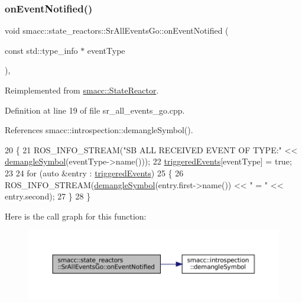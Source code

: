 \subsubsection{\texorpdfstring{on\+Event\+Notified()}{onEventNotified()}}
{\footnotesize\ttfamily void smacc\+::state\+\_\+reactors\+::\+Sr\+All\+Events\+Go\+::on\+Event\+Notified (\begin{DoxyParamCaption}\item[{const std\+::type\+\_\+info $\ast$}]{event\+Type }\end{DoxyParamCaption})\hspace{0.3cm}{\ttfamily [override]}, {\ttfamily [virtual]}}



Reimplemented from \hyperlink{classsmacc_1_1StateReactor_a17646b3c68a6d80d1e4da8c14238ce36}{smacc\+::\+State\+Reactor}.



Definition at line 19 of file sr\+\_\+all\+\_\+events\+\_\+go.\+cpp.



References smacc\+::introspection\+::demangle\+Symbol().


\begin{DoxyCode}
20 \{
21     ROS\_INFO\_STREAM(\textcolor{stringliteral}{"SB ALL RECEIVED EVENT OF TYPE:"} << \hyperlink{namespacesmacc_1_1introspection_a2f495108db3e57604d8d3ff5ef030302}{demangleSymbol}(eventType->name()));
22     \hyperlink{classsmacc_1_1state__reactors_1_1SrAllEventsGo_a2c3d7c7e15ed155ae6e83fe49e7897e9}{triggeredEvents}[eventType] = \textcolor{keyword}{true};
23 
24     \textcolor{keywordflow}{for} (\textcolor{keyword}{auto} &entry : \hyperlink{classsmacc_1_1state__reactors_1_1SrAllEventsGo_a2c3d7c7e15ed155ae6e83fe49e7897e9}{triggeredEvents})
25     \{
26         ROS\_INFO\_STREAM(\hyperlink{namespacesmacc_1_1introspection_a2f495108db3e57604d8d3ff5ef030302}{demangleSymbol}(entry.first->name()) << \textcolor{stringliteral}{" = "} << entry.second);
27     \}
28 \}
\end{DoxyCode}
Here is the call graph for this function\+:
\nopagebreak
\begin{figure}[H]
\begin{center}
\leavevmode
\includegraphics[width=350pt]{classsmacc_1_1state__reactors_1_1SrAllEventsGo_abd72dc79374c34111d24691c459850c2_cgraph}
\end{center}
\end{figure}
\mbox{\label{classsmacc_1_1state__reactors_1_1SrAllEventsGo_adda075f2b3ec56115d02e9fb1a1c26fe}} 
